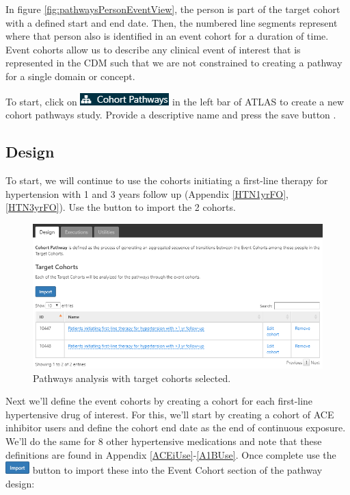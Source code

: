 \documentclass[11pt]{book}
\theoremstyle{definition}
\theoremstyle{definition}
\theoremstyle{definition}
\theoremstyle{remark}
\begin{document}
In figure \ref{fig:pathwaysPersonEventView}, the person is part of the target cohort with a defined start and end date. Then, the numbered line segments represent where that person also is identified in an event cohort for a duration of time. Event cohorts allow us to describe any clinical event of interest that is represented in the CDM such that we are not constrained to creating a pathway for a single domain or concept.

To start, click on \includegraphics{images/Characterization/atlasPathwaysMenuItem.png} in the left bar of ATLAS to create a new cohort pathways study. Provide a descriptive name and press the save button .

\hypertarget{design-1}{%
\subsection{Design}\label{design-1}}

To start, we will continue to use the cohorts initiating a first-line therapy for hypertension with 1 and 3 years follow up (Appendix \ref{HTN1yrFO}, \ref{HTN3yrFO}). Use the button to import the 2 cohorts.

\begin{figure}

{\centering \includegraphics[width=1\linewidth]{images/Characterization/atlasPathwaysTargetCohorts} 

}

\caption{Pathways analysis with target cohorts selected.}\label{fig:atlasPathwaysTargetCohorts}
\end{figure}

Next we'll define the event cohorts by creating a cohort for each first-line hypertensive drug of interest. For this, we'll start by creating a cohort of ACE inhibitor users and define the cohort end date as the end of continuous exposure. We'll do the same for 8 other hypertensive medications and note that these definitions are found in Appendix \ref{ACEiUse}-\ref{A1BUse}. Once complete use the \includegraphics{images/Characterization/atlasImportButton.png} button to import these into the Event Cohort section of the pathway design:
\end{document}
